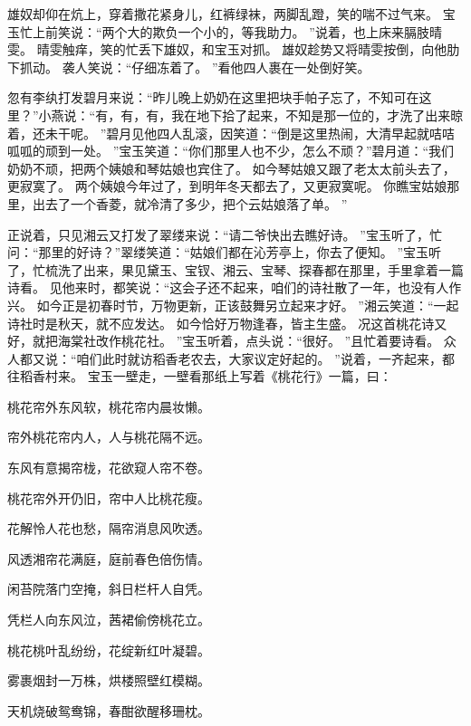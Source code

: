雄奴却仰在炕上，穿着撒花紧身儿，红裤绿袜，两脚乱蹬，笑的喘不过气来。
宝玉忙上前笑说：“两个大的欺负一个小的，等我助力。
”说着，也上床来膈肢晴雯。
晴雯触痒，笑的忙丢下雄奴，和宝玉对抓。
雄奴趁势又将晴雯按倒，向他肋下抓动。
袭人笑说：“仔细冻着了。
”看他四人裹在一处倒好笑。
\par
忽有李纨打发碧月来说：“昨儿晚上奶奶在这里把块手帕子忘了，不知可在这里？”小燕说：“有，有，有，我在地下拾了起来，不知是那一位的，才洗了出来晾着，还未干呢。
”碧月见他四人乱滚，因笑道：“倒是这里热闹，大清早起就咭咭呱呱的顽到一处。
”宝玉笑道：“你们那里人也不少，怎么不顽？”碧月道：“我们奶奶不顽，把两个姨娘和琴姑娘也宾住了。
如今琴姑娘又跟了老太太前头去了，更寂寞了。
两个姨娘今年过了，到明年冬天都去了，又更寂寞呢。
你瞧宝姑娘那里，出去了一个香菱，就冷清了多少，把个云姑娘落了单。
”\par
正说着，只见湘云又打发了翠缕来说：“请二爷快出去瞧好诗。
”宝玉听了，忙问：“那里的好诗？”翠缕笑道：“姑娘们都在沁芳亭上，你去了便知。
”宝玉听了，忙梳洗了出来，果见黛玉、宝钗、湘云、宝琴、探春都在那里，手里拿着一篇诗看。
见他来时，都笑说：“这会子还不起来，咱们的诗社散了一年，也没有人作兴。
如今正是初春时节，万物更新，正该鼓舞另立起来才好。
”湘云笑道：“一起诗社时是秋天，就不应发达。
如今恰好万物逢春，皆主生盛。
况这首桃花诗又好，就把海棠社改作桃花社。
”宝玉听着，点头说：“很好。
”且忙着要诗看。
众人都又说：“咱们此时就访稻香老农去，大家议定好起的。
”说着，一齐起来，都往稻香村来。
宝玉一壁走，一壁看那纸上写着《桃花行》一篇，曰：\par
\hop
桃花帘外东风软，桃花帘内晨妆懒。
\par
帘外桃花帘内人，人与桃花隔不远。
\par
东风有意揭帘栊，花欲窥人帘不卷。
\par
桃花帘外开仍旧，帘中人比桃花瘦。
\par
花解怜人花也愁，隔帘消息风吹透。
\par
风透湘帘花满庭，庭前春色倍伤情。
\par
闲苔院落门空掩，斜日栏杆人自凭。
\par
凭栏人向东风泣，茜裙偷傍桃花立。
\par
桃花桃叶乱纷纷，花绽新红叶凝碧。
\par
雾裹烟封一万株，烘楼照壁红模糊。
\par
天机烧破鸳鸯锦，春酣欲醒移珊枕。
